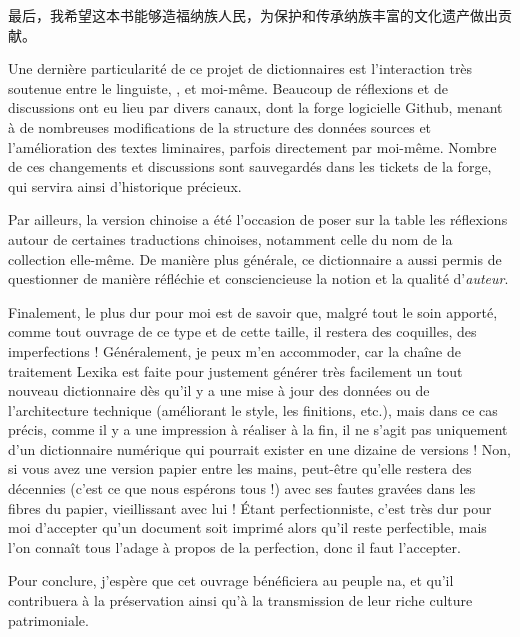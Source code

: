 最后，我希望这本书能够造福纳族人民，为保护和传承纳族丰富的文化遗产做出贡献。



Une dernière particularité de ce projet de dictionnaires est l’interaction très soutenue entre le linguiste, \alexisfra, et moi-même. Beaucoup de réflexions et de discussions ont eu lieu par divers canaux, dont la forge logicielle Github, menant à de nombreuses modifications de la structure des données sources et l’amélioration des textes liminaires, parfois directement par moi-même. Nombre de ces changements et discussions sont sauvegardés dans les tickets de la forge, qui servira ainsi d’historique précieux.

Par ailleurs, la version chinoise a été l’occasion de poser sur la table les réflexions autour de certaines traductions chinoises, notamment celle du nom de la collection elle-même. De manière plus générale, ce dictionnaire a aussi permis de questionner de manière réfléchie et consciencieuse la notion et la qualité d’\emph{auteur}.

Finalement, le plus dur pour moi est de savoir que, malgré tout le soin apporté, comme tout ouvrage de ce type et de cette taille, il restera des coquilles, des imperfections ! Généralement, je peux m’en accommoder, car la chaîne de traitement Lexika est faite pour justement générer très facilement un tout nouveau dictionnaire dès qu’il y a une mise à jour des données ou de l’architecture technique (améliorant le style, les finitions, etc.), mais dans ce cas précis, comme il y a une impression à réaliser à la fin, il ne s’agit pas uniquement d’un dictionnaire numérique qui pourrait exister en une dizaine de versions ! Non, si vous avez une version papier entre les mains, peut-être qu’elle restera des décennies (c’est ce que nous espérons tous !) avec ses fautes gravées dans les fibres du papier, vieillissant avec lui ! Étant perfectionniste, c’est très dur pour moi d’accepter qu’un document soit imprimé alors qu’il reste perfectible, mais l’on connaît tous l’adage à propos de la perfection, donc il faut l’accepter.

Pour conclure, j'espère que cet ouvrage bénéficiera au peuple na, et qu'il contribuera à la préservation ainsi qu'à la transmission de leur riche culture patrimoniale.

\bigskip

\hfill \benjaminfra
